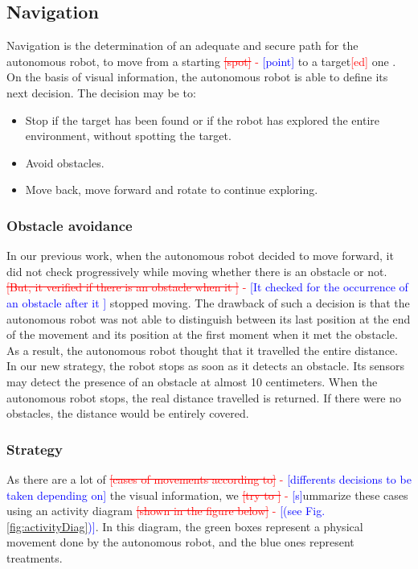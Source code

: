 \documentclass[12pt]{report}
\newcommand{\hcr}[2]{\textcolor{red}{\sout{[#1]} - \textcolor{blue}{ [#2]}}}
\newcommand{\hc}[1]{\textcolor{red}{[#1]}}
\begin{document}
 \subsection{Navigation}
     
 Navigation is the determination of an adequate and secure path for the autonomous robot, to move from a starting 
\hcr{spot}{point} to a target\hc{ed} one \cite{bonin-font_visual_2008}. On the basis of visual information, the 
autonomous robot is able to define its next decision. The decision may be to:
 \begin{itemize}
 	\item Stop if the target has been found or if the robot has explored the entire environment, without spotting the target.
 	\item Avoid obstacles.
 	\item Move back, move forward and rotate to continue exploring.
 \end{itemize}

\subsubsection{Obstacle avoidance}

In our previous work, when the autonomous robot decided to move forward, it did not check progressively while moving 
whether there is an obstacle or not. \hcr{But, it verified if there is an obstacle when it }{It checked for the 
occurrence of an obstacle after it } stopped moving. The drawback of such a decision is that the autonomous robot was 
not able to distinguish between its last position at the end of the movement and its position at the first moment when 
it met the obstacle. As a result, the autonomous robot thought that it travelled the entire distance.\\

In our new strategy, the robot stops as soon as it detects an obstacle. Its sensors may detect the presence 
of an obstacle at almost 10 centimeters. When the autonomous robot stops, the real distance travelled is returned. If 
there were no obstacles, the distance would be entirely covered.

\subsubsection{Strategy}

As there are a lot of \hcr{cases of movements according to}{differents decisions to be taken depending on} the visual 
information, we \hcr{try to } summarize these cases using an activity diagram \hcr{shown in the figure below}{(see Fig. 
\ref{fig:activityDiag})}. In this diagram, the green boxes represent a physical movement done by the autonomous robot, 
and the blue ones represent treatments.\\
\end{document}
